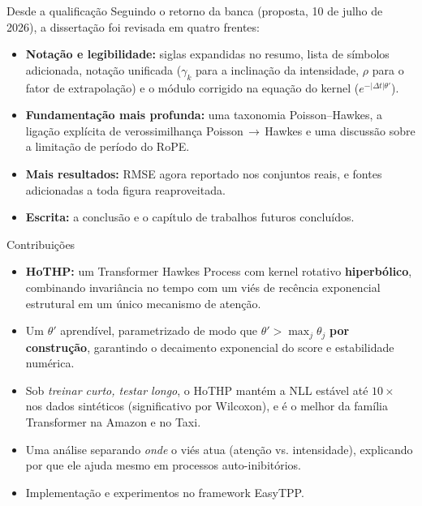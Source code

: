 \documentclass[aspectratio=169,9pt]{beamer}
\begin{document}
\begin{frame}{Desde a qualificação}
  Seguindo o retorno da banca (proposta, 10 de julho de 2026), a dissertação
  foi revisada em quatro frentes:
  \vspace{0.4em}
  \begin{itemize}
    \item \textbf{Notação e legibilidade:} siglas expandidas no resumo, lista de
          símbolos adicionada, notação unificada ($\gamma_k$ para a inclinação da
          intensidade, $\rho$ para o fator de extrapolação) e o módulo corrigido
          na equação do kernel ($e^{-|\Delta t|\theta'}$).
    \item \textbf{Fundamentação mais profunda:} uma taxonomia Poisson--Hawkes, a
          ligação explícita de verossimilhança Poisson\,$\to$\,Hawkes e uma
          discussão sobre a limitação de período do RoPE.
    \item \textbf{Mais resultados:} RMSE agora reportado nos conjuntos reais, e
          fontes adicionadas a toda figura reaproveitada.
    \item \textbf{Escrita:} a conclusão e o capítulo de trabalhos futuros
          concluídos.
  \end{itemize}
\end{frame}

\begin{frame}{Contribuições}
  \begin{itemize}
    \item \textbf{HoTHP:} um Transformer Hawkes Process com kernel rotativo
          \textbf{hiperbólico}, combinando invariância no tempo com um viés de
          recência exponencial estrutural em um único mecanismo de atenção.
    \item Um $\theta'$ aprendível, parametrizado de modo que
          $\theta' > \max_j \theta_j$ \textbf{por construção}, garantindo o
          decaimento exponencial do score e estabilidade numérica.
    \item Sob \emph{treinar curto, testar longo}, o HoTHP mantém a NLL estável até
          $10\times$ nos dados sintéticos (significativo por Wilcoxon), e é o
          melhor da família Transformer na Amazon e no Taxi.
    \item Uma análise separando \emph{onde} o viés atua (atenção vs. intensidade),
          explicando por que ele ajuda mesmo em processos auto-inibitórios.
    \item Implementação e experimentos no framework EasyTPP.
  \end{itemize}
\end{frame}
\end{document}
